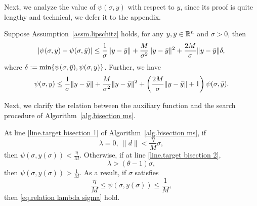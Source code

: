 \documentclass{mcom-l}
\numberwithin{equation}{section}
\begin{document}
Next, we analyze the value of $\psi(\sigma,y)$ with respect to $y$, since its proof is quite lengthy and technical, we defer it to the appendix.
\begin{lemma}
    \label{lem.psi property wrt y}
    Suppose Assumption~\ref{assm.lipschitz} holds, for any $y,\Bar{y} \in \mathbb{R}^n$ and $\sigma>0$, then
    \begin{equation}
        \label{eq.psi property wrt y}
        \left \vert \psi(\sigma,y)-\psi(\sigma,\Bar{y}) \right\vert \leq \frac{1}{\sigma}\|y-\Bar{y}\| +\frac{M}{\sigma^2}\|y-\Bar{y}\|^2 +\frac{2M}{\sigma}\|y-\Bar{y}\|\delta,
    \end{equation}
    where $\delta:=\min\{\psi(\sigma,\Bar{y}),\psi(\sigma,y)\}$. Further, we have
    \begin{equation}
        \label{eq.psi property wrt y advanced}
        \psi(\sigma,y) \leq \frac{1}{\sigma}\|y-\Bar{y}\| +\frac{M}{\sigma^2}\|y-\Bar{y}\|^2 +\left(\frac{2M}{\sigma}\|y-\Bar{y}\|+1\right)\psi(\sigma,\Bar{y}).
    \end{equation}
\end{lemma}
Next, we clarify the relation between the auxiliary function and the search procedure of Algorithm~\ref{alg.bisection ms}.
\begin{lemma}
    \label{lem.reduce line search}
    At line \ref{line.target bisection 1} of Algorithm~\ref{alg.bisection ms}, if
    \begin{equation}
        \label{eq.bracket small lambda}
        \lambda = 0, \ \|d\|<\frac{\eta}{M}\sigma,
    \end{equation}
    then $\psi(\sigma,y(\sigma))<\frac{\eta}{M}$.  Otherwise, if at line \ref{line.target bisection 2},
    \begin{equation}
        \label{eq.bracket big lambda}
        \lambda > (\theta-1)\sigma,
    \end{equation}
    then $\psi(\sigma,y(\sigma))>\frac{1}{M}$. As a result, if $\sigma$ satisfies
    \begin{equation}
        \label{eq.reduce line search interval}
        \frac{\eta}{M}\leq \psi(\sigma,y(\sigma)) \leq \frac{1}{M},
    \end{equation}
    then \eqref{eq.relation lambda sigma} hold.
\end{lemma}
\end{document}
